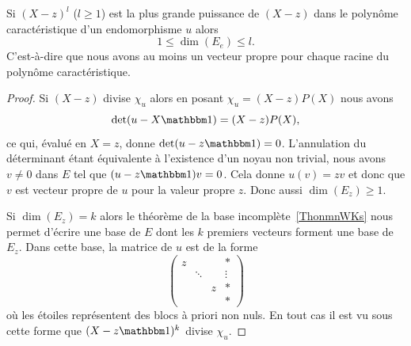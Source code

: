 \begin{proposition}\label{PropooBYZCooBmYLSc}
    Si \( (X-z)^l\) (\( l\geq 1\)) est la plus grande puissance de \( (X-z)\) dans le polynôme caractéristique d'un endomorphisme \( u\) alors
    \begin{equation}
        1\leq \dim(E_e)\leq l.
    \end{equation}
    C'est-à-dire que nous avons au moins un vecteur propre pour chaque racine du polynôme caractéristique.
\end{proposition}

\begin{proof}
    Si $(X-z)$ divise \( \chi_u\) alors en posant \( \chi_u=(X-z)P(X)\) nous avons
    \begin{equation}
        \det(u-X\mtu)=(X-z)P(X),
    \end{equation}
    ce qui, évalué en \( X=z\), donne \( \det(u-z\mtu)=0\). L'annulation du déterminant étant équivalente à l'existence d'un noyau non trivial, nous avons \( v\neq 0\) dans \( E\) tel que \( (u-z\mtu)v=0\). Cela donne \( u(v)=zv\) et donc que \( v\) est vecteur propre de \( u\) pour la valeur propre \( z\). Donc aussi \( \dim(E_z)\geq 1\).

    Si \( \dim(E_z)=k\) alors le théorème de la base incomplète~\ref{ThonmnWKs} nous permet d'écrire une base de \( E\) dont les \( k\) premiers vecteurs forment une base de \( E_z\). Dans cette base, la matrice de \( u\) est de la forme
    \begin{equation}
        \begin{pmatrix}
             z   &       &       &   *    \\
                &   \ddots    &       &   \vdots    \\
                &       &   z    &   *    \\
                &       &       &   *
         \end{pmatrix}
    \end{equation}
    où les étoiles représentent des blocs à priori non nuls. En tout cas il est vu sous cette forme que \( (X-z\mtu)^k\) divise \( \chi_u\).
\end{proof}


